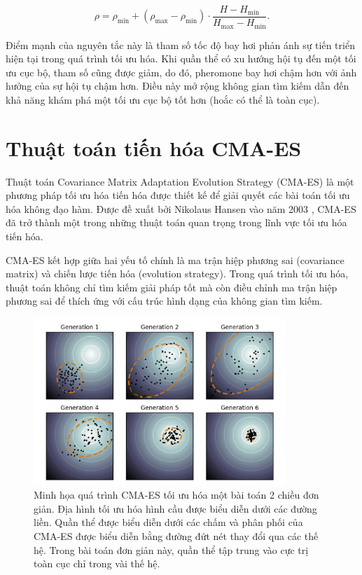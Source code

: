\begin{equation}\label{eq:AACO-NC:adaptrho}
    \rho = \rho_{\text{min}} + (\rho_{\text{max}} - \rho_{\text{min}}) \cdot \frac{H - H_{\text{min}}}{H_{\text{max}} - H_{\text{min}}}.
\end{equation}

Điểm mạnh của nguyên tắc này là tham số tốc độ bay hơi phản ánh sự tiến triển hiện tại trong quá trình tối ưu hóa. Khi quần thể có xu hướng hội tụ đến một tối ưu cục bộ, tham số cũng được giảm, do đó, pheromone bay hơi chậm hơn với ảnh hưởng của sự hội tụ chậm hơn. Điều này mở rộng không gian tìm kiếm dẫn đến khả năng khám phá một tối ưu cục bộ tốt hơn (hoắc có thể là toàn cục).

\section{Thuật toán tiến hóa CMA-ES}\label{section:bgCMA-ES}
Thuật toán Covariance Matrix Adaptation Evolution Strategy (CMA-ES) là một phương pháp tối ưu hóa tiến hóa được thiết kế để giải quyết các bài toán tối ưu hóa không đạo hàm. Được đề xuất bởi Nikolaus Hansen vào năm 2003 \cite{hansen2003ecj}, CMA-ES đã trở thành một trong những thuật toán quan trọng trong lĩnh vực tối ưu hóa tiến hóa.

CMA-ES kết hợp giữa hai yếu tố chính là ma trận hiệp phương sai (covariance matrix) và chiến lược tiến hóa (evolution strategy). Trong quá trình tối ưu hóa, thuật toán không chỉ tìm kiếm giải pháp tốt mà còn điều chỉnh ma trận hiệp phương sai để thích ứng với cấu trúc hình dạng của không gian tìm kiếm.

\begin{figure}[ht!]
    \centering
    \includegraphics[width=0.85\textwidth]{Figures/Concept_of_directional_optimization_in_CMA-ES_algorithm.png}
    \caption[Minh họa quá trình CMA-ES tối ưu hóa một bài toán 2 chiều đơn giản.]{Minh họa quá trình CMA-ES tối ưu hóa một bài toán 2 chiều đơn giản. Địa hình tối ưu hóa hình cầu được biểu diễn dưới các đường liền. Quần thể được biểu diễn dưới các chấm và phân phối của CMA-ES được biểu diễn bằng đường đứt nét thay đổi qua các thế hệ. Trong bài toán đơn giản này, quần thể tập trung vào cực trị toàn cục chỉ trong vài thế hệ.}
    \label{fig:CMA-ES}
\end{figure}

